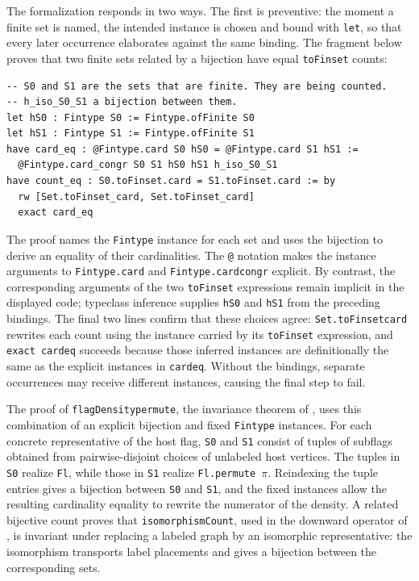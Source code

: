 \documentclass[acmsmall,screen=true,acmthm=false]{acmart}
\DeclareRobustCommand{\lean}[1]{{\def\_{\textunderscore\allowbreak}\texttt{#1}}}
\begin{document}
The formalization responds in two ways.  The first is preventive: the moment a
finite set is named, the intended instance is chosen and bound with
\lean{let}, so that every later occurrence elaborates against the same
binding.  The fragment below proves that two finite sets
related by a bijection have equal \lean{toFinset} counts:
\begin{lstlisting}
-- S0 and S1 are the sets that are finite. They are being counted.
-- h_iso_S0_S1 a bijection between them.
let hS0 : Fintype S0 := Fintype.ofFinite S0
let hS1 : Fintype S1 := Fintype.ofFinite S1
have card_eq : @Fintype.card S0 hS0 = @Fintype.card S1 hS1 :=
  @Fintype.card_congr S0 S1 hS0 hS1 h_iso_S0_S1
have count_eq : S0.toFinset.card = S1.toFinset.card := by
  rw [Set.toFinset_card, Set.toFinset_card]
  exact card_eq
\end{lstlisting}
The proof names the \lean{Fintype} instance for each set and uses the bijection
to derive an equality of their cardinalities.  The \lean{@} notation makes the
instance arguments to \lean{Fintype.card} and \lean{Fintype.card\_congr}
explicit.  By contrast, the corresponding arguments of the two
\lean{toFinset} expressions remain implicit in the displayed code; typeclass
inference supplies \lean{hS0} and \lean{hS1} from the preceding bindings.  The
final two lines confirm that these choices agree: \lean{Set.toFinset\_card}
rewrites each count using the instance carried by its \lean{toFinset}
expression, and \lean{exact card\_eq} succeeds because those inferred instances
are definitionally the same as the explicit instances in \lean{card\_eq}.
Without the bindings, separate occurrences may receive different instances,
causing the final step to fail.

The proof of \lean{flagDensity\allowbreak\_permute}, the invariance theorem of
, uses this combination of an explicit
bijection and fixed \lean{Fintype} instances.  For each concrete representative
of the host flag, \lean{S0} and \lean{S1} consist of tuples of subflags obtained
from pairwise-disjoint choices of unlabeled host vertices.  The tuples in
\lean{S0} realize \lean{Fl}, while those in \lean{S1} realize
\lean{Fl.permute $\pi$}.  Reindexing the tuple entries gives a bijection between
\lean{S0} and \lean{S1}, and the fixed instances allow the resulting
cardinality equality to rewrite the numerator of the density.  A related
bijective count proves that \lean{isomorphismCount}, used in the downward
operator of , is invariant under replacing a labeled
graph by an isomorphic representative: the isomorphism transports label
placements and gives a bijection between the corresponding sets.
\end{document}
